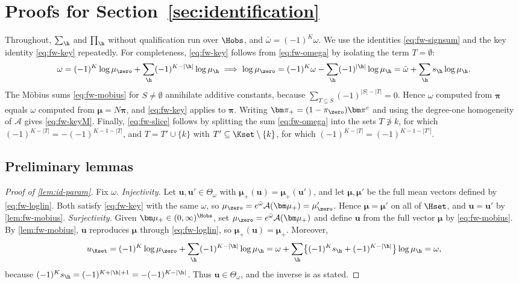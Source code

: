 \section{Proofs for Section~\ref{sec:identification}}\label{app:idproofs}

Throughout, $\sum_{\h}$ and $\prod_{\h}$ without qualification run over $\Hobs$, and $\bar\omega=(-1)^K\omega$. We use the identities \eqref{eq:fw-signsum} and the key identity \eqref{eq:fw-key} repeatedly. For completeness, \eqref{eq:fw-key} follows from \eqref{eq:fw-omega} by isolating the term $T=\emptyset$:
\[
  \omega=(-1)^K\log\mu_{\zero}+\sum_{\h}(-1)^{K-|\h|}\log\mu_{\h}
  \;\Longrightarrow\;
  \log\mu_{\zero}=(-1)^K\omega-\sum_{\h}(-1)^{|\h|}\log\mu_{\h}=\bar\omega+\sum_{\h}s_{\h}\log\mu_{\h}.
\]
The Möbius sums \eqref{eq:fw-mobius} for $S\neq\emptyset$ annihilate additive constants, because $\sum_{T\subseteq S}(-1)^{|S|-|T|}=0$. Hence $\omega$ computed from $\bm\pi$ equals $\omega$ computed from $\bm\mu=N\bm\pi$, and \eqref{eq:fw-key} applies to $\bm\pi$. Writing $\bm\pi_+=(1-\pi_{\zero})\bm\pi^c$ and using the degree-one homogeneity of $\mathcal A$ gives \eqref{eq:fw-keyM}. Finally, \eqref{eq:fw-slice} follows by splitting the sum \eqref{eq:fw-omega} into the sets $T\not\ni k$, for which $(-1)^{K-|T|}=-(-1)^{K-1-|T|}$, and $T=T'\cup\{k\}$ with $T'\subseteq\Kset\setminus\{k\}$, for which $(-1)^{K-|T|}=(-1)^{K-1-|T'|}$.

\subsection{Preliminary lemmas}\label{app:id-prelim}

\begin{proof}[Proof of \cref{lem:id-param}]
Fix $\omega$. \emph{Injectivity.} Let $\bm u,\bm u'\in\Theta_\omega$ with $\bm\mu_+(\bm u)=\bm\mu_+(\bm u')$, and let $\bm\mu,\bm\mu'$ be the full mean vectors defined by \eqref{eq:fw-loglin}. Both satisfy \eqref{eq:fw-key} with the same $\omega$, so $\mu_{\zero}=e^{\bar\omega}\mathcal A(\bm\mu_+)=\mu'_{\zero}$. Hence $\bm\mu=\bm\mu'$ on all of $\Hset$, and $\bm u=\bm u'$ by \cref{lem:fw-mobius}.
\emph{Surjectivity.} Given $\bm\mu_+\in(0,\infty)^{\Hobs}$, set $\mu_{\zero}=e^{\bar\omega}\mathcal A(\bm\mu_+)$ and define $\bm u$ from the full vector $\bm\mu$ by \eqref{eq:fw-mobius}. By \cref{lem:fw-mobius}, $\bm u$ reproduces $\bm\mu$ through \eqref{eq:fw-loglin}, so $\bm\mu_+(\bm u)=\bm\mu_+$. Moreover,
\[
  u_{\Kset}=(-1)^K\log\mu_{\zero}+\sum_{\h}(-1)^{K-|\h|}\log\mu_{\h}
  =\omega+\sum_{\h}\bigl\{(-1)^Ks_{\h}+(-1)^{K-|\h|}\bigr\}\log\mu_{\h}=\omega,
\]
because $(-1)^Ks_{\h}=(-1)^{K+|\h|+1}=-(-1)^{K-|\h|}$. Thus $\bm u\in\Theta_\omega$, and the inverse is as stated.
\end{proof}

